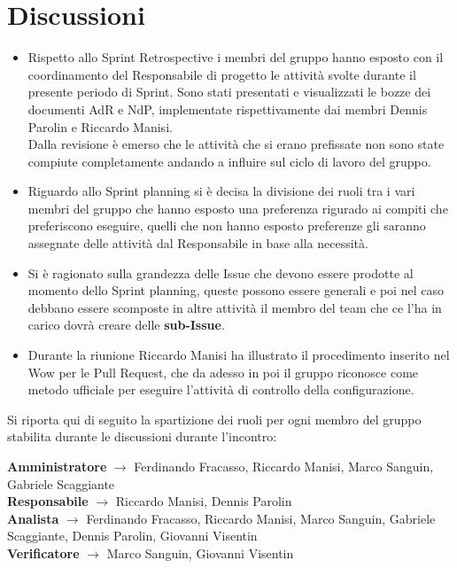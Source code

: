 \documentclass[a4paper,12pt]{article}
\begin{document}
\section{Discussioni}
\begin{itemize}
    \item Rispetto allo Sprint Retrospective i membri del gruppo hanno esposto con il coordinamento del Responsabile di progetto le attività svolte durante il presente periodo di Sprint. Sono stati presentati e visualizzati le bozze dei documenti AdR e NdP, implementate rispettivamente dai membri Dennis Parolin e Riccardo Manisi.\\Dalla revisione è emerso che le attività che si erano prefissate non sono state compiute completamente andando a influire sul ciclo di lavoro del gruppo.
    \item Riguardo allo Sprint planning si è decisa la divisione dei ruoli tra i vari membri del gruppo che hanno esposto una preferenza rigurado ai compiti che preferiscono eseguire, quelli che non hanno esposto preferenze gli saranno assegnate delle attività dal Responsabile in base alla necessità.
    \item Si è ragionato sulla grandezza delle Issue che devono essere prodotte al momento dello Sprint planning, queste possono essere generali e poi nel caso debbano essere scomposte in altre attività il membro del team che ce l'ha in carico dovrà creare delle \textbf{sub-Issue}.
    \item Durante la riunione Riccardo Manisi ha illustrato il procedimento inserito nel Wow per le Pull Request, che da adesso in poi il gruppo riconosce come metodo ufficiale per eseguire l'attività di controllo della configurazione. 
\end{itemize}
Si riporta qui di seguito la spartizione dei ruoli per ogni membro del gruppo stabilita durante le discussioni durante l'incontro:
\begin{center}
    \textbf{Amministratore} $\rightarrow$ Ferdinando Fracasso, Riccardo Manisi, Marco Sanguin, Gabriele Scaggiante\\
    \textbf{Responsabile} $\rightarrow$ Riccardo Manisi, Dennis Parolin\\
    \textbf{Analista} $\rightarrow$ Ferdinando Fracasso, Riccardo Manisi, Marco Sanguin, Gabriele Scaggiante, Dennis Parolin, Giovanni Visentin\\
    \textbf{Verificatore} $\rightarrow$ Marco Sanguin, Giovanni Visentin
\end{center}
\end{document}
